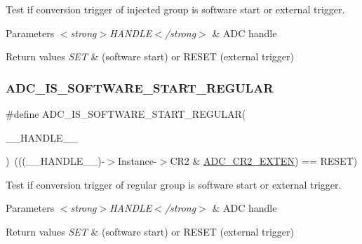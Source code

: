 Test if conversion trigger of injected group is software start or external trigger. 


\begin{DoxyParams}{Parameters}
{\em $<$strong$>$\+H\+A\+N\+D\+L\+E$<$/strong$>$} & A\+DC handle \\
\hline
\end{DoxyParams}

\begin{DoxyRetVals}{Return values}
{\em S\+ET} & (software start) or R\+E\+S\+ET (external trigger) \\
\hline
\end{DoxyRetVals}
\mbox{\label{group___a_d_c___private___macros_ga2ccb82ecf85d6c6d1ff2cdf9b6a82d2b}} 
\subsubsection{\texorpdfstring{ADC\_IS\_SOFTWARE\_START\_REGULAR}{ADC\_IS\_SOFTWARE\_START\_REGULAR}}
{\footnotesize\ttfamily \#define A\+D\+C\+\_\+\+I\+S\+\_\+\+S\+O\+F\+T\+W\+A\+R\+E\+\_\+\+S\+T\+A\+R\+T\+\_\+\+R\+E\+G\+U\+L\+AR(\begin{DoxyParamCaption}\item[{}]{\+\_\+\+\_\+\+H\+A\+N\+D\+L\+E\+\_\+\+\_\+ }\end{DoxyParamCaption})~(((\+\_\+\+\_\+\+H\+A\+N\+D\+L\+E\+\_\+\+\_\+)-\/$>$Instance-\/$>$C\+R2 \& \mbox{\hyperlink{group___peripheral___registers___bits___definition_ga574b4d8e90655d0432882d620e629234}{A\+D\+C\+\_\+\+C\+R2\+\_\+\+E\+X\+T\+EN}}) == R\+E\+S\+ET)}



Test if conversion trigger of regular group is software start or external trigger. 


\begin{DoxyParams}{Parameters}
{\em $<$strong$>$\+H\+A\+N\+D\+L\+E$<$/strong$>$} & A\+DC handle \\
\hline
\end{DoxyParams}

\begin{DoxyRetVals}{Return values}
{\em S\+ET} & (software start) or R\+E\+S\+ET (external trigger) \\
\hline
\end{DoxyRetVals}
\mbox{\label{group___a_d_c___private___macros_ga29f7414128fbbdb81db6ea6ede449f4b}} 

